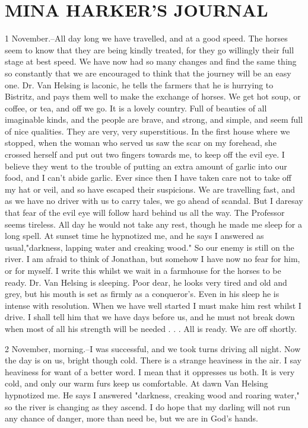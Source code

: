 \chapter{MINA HARKER'S JOURNAL}

1 November.--All day long we have travelled, and at a good speed. The horses seem to know that they are being kindly treated, for they go willingly their full stage at best speed. We have now had so many changes and find the same thing so constantly that we are encouraged to think that the journey will be an easy one. Dr. Van Helsing is laconic, he tells the farmers that he is hurrying to Bistritz, and pays them well to make the exchange of horses. We get hot soup, or coffee, or tea, and off we go. It is a lovely country. Full of beauties of all imaginable kinds, and the people are brave, and strong, and simple, and seem full of nice qualities. They are very, very superstitious. In the first house where we stopped, when the woman who served us saw the scar on my forehead, she crossed herself and put out two fingers towards me, to keep off the evil eye. I believe they went to the trouble of putting an extra amount of garlic into our food, and I can't abide garlic. Ever since then I have taken care not to take off my hat or veil, and so have escaped their suspicions. We are travelling fast, and as we have no driver with us to carry tales, we go ahead of scandal. But I daresay that fear of the evil eye will follow hard behind us all the way. The Professor seems tireless. All day he would not take any rest, though he made me sleep for a long spell. At sunset time he hypnotized me, and he says I answered as usual,"darkness, lapping water and creaking wood." So our enemy is still on the river. I am afraid to think of Jonathan, but somehow I have now no fear for him, or for myself. I write this whilst we wait in a farmhouse for the horses to be ready. Dr. Van Helsing is sleeping. Poor dear, he looks very tired and old and grey, but his mouth is set as firmly as a conqueror's. Even in his sleep he is intense with resolution. When we have well started I must make him rest whilst I drive. I shall tell him that we have days before us, and he must not break down when most of all his strength will be needed . . . All is ready. We are off shortly. 

2 November, morning.--I was successful, and we took turns driving all night. Now the day is on us, bright though cold. There is a strange heaviness in the air. I say heaviness for want of a better word. I mean that it oppresses us both. It is very cold, and only our warm furs keep us comfortable. At dawn Van Helsing hypnotized me. He says I answered "darkness, creaking wood and roaring water," so the river is changing as they ascend. I do hope that my darling will not run any chance of danger, more than need be, but we are in God's hands. 

